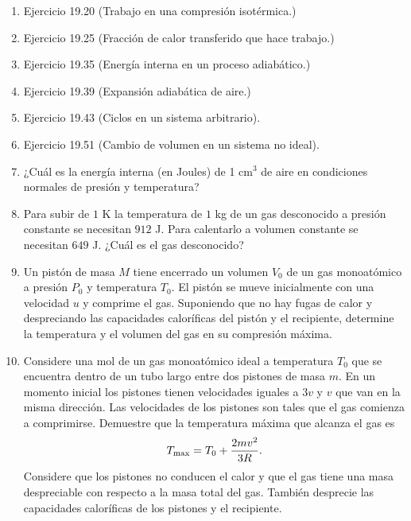 \documentclass{article}
\begin{document}
\begin{enumerate}

\item
Ejercicio 19.20 (Trabajo en una compresi\'on isot\'ermica.)

\item
Ejercicio 19.25 (Fracci\'on de calor transferido que hace trabajo.)

\item 
Ejercicio 19.35 (Energ\'ia interna en un proceso adiab\'atico.)

\item 
Ejercicio 19.39 (Expansi\'on adiab\'atica de aire.)

\item 
Ejercicio 19.43 (Ciclos en un sistema arbitrario).

\item 
Ejercicio 19.51 (Cambio de volumen en un sistema no ideal).


\item
¿Cuál es la energía interna (en Joules) de 1 cm$^3$ de aire en condiciones normales de presi\'on y temperatura?

\item
Para subir de $1$ K la temperatura de $1$ kg de un gas desconocido a
presi\'on constante se necesitan $912$ J. Para calentarlo a volumen
constante se necesitan $649$ J. ¿Cuál es el gas desconocido?

\item
Un pist\'on de masa $M$ tiene encerrado un volumen $V_0$ de un gas
monoat\'omico a presi\'on $P_0$ y temperatura $T_0$. El pist\'on se
mueve inicialmente con una velocidad $u$ y comprime el gas. Suponiendo
que no hay fugas de calor y despreciando las capacidades calor\'ificas
del pistón y el recipiente, determine la temperatura y el volumen del gas en su
compresi\'on m\'axima.

\item 
Considere una mol de un gas monoat\'omico ideal a temperatura $T_0$
que se encuentra dentro de un tubo largo entre dos pistones de masa
$m$. En un momento inicial los pistones tienen velocidades iguales a
$3v$ y $v$ que van en la misma direcci\'on. Las velocidades de los pistones son
tales que el gas comienza a comprimirse. Demuestre que la
temperatura máxima que alcanza el gas es 
\begin{displaymath}
T_{\rm max} = T_{0} + \frac{2mv^2}{3R}.
\end{displaymath}
Considere que los pistones no conducen el calor y que el gas tiene una
masa despreciable con respecto a la masa total del gas.  Tambi\'en
desprecie las capacidades calor\'ificas de los pistones y el recipiente.



\end{enumerate}
\end{document}

